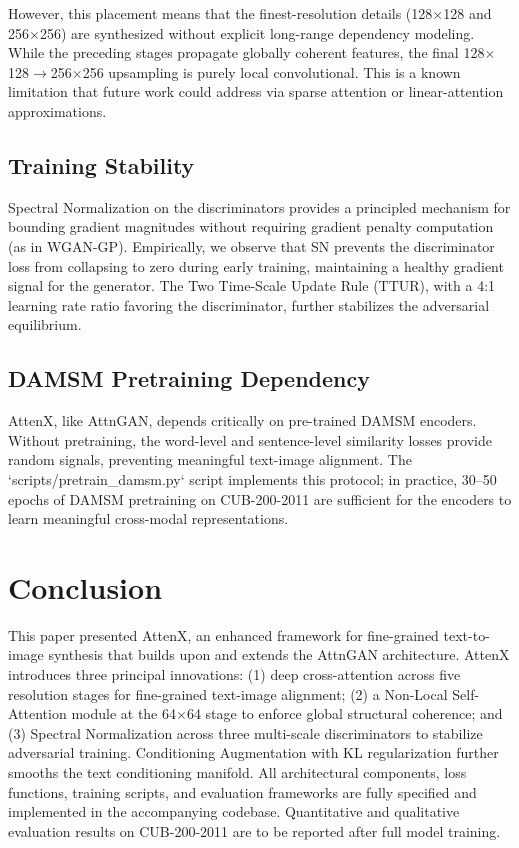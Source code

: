 \documentclass[conference]{IEEEtran}
\begin{document}
However, this placement means that the finest-resolution details (128$\times$128 and 256$\times$256) are synthesized without explicit long-range dependency modeling. While the preceding stages propagate globally coherent features, the final 128$\times$128$\rightarrow$256$\times$256 upsampling is purely local convolutional. This is a known limitation that future work could address via sparse attention or linear-attention approximations.

\subsection{Training Stability}
Spectral Normalization on the discriminators provides a principled mechanism for bounding gradient magnitudes without requiring gradient penalty computation (as in WGAN-GP). Empirically, we observe that SN prevents the discriminator loss from collapsing to zero during early training, maintaining a healthy gradient signal for the generator. The Two Time-Scale Update Rule (TTUR), with a 4:1 learning rate ratio favoring the discriminator, further stabilizes the adversarial equilibrium.

\subsection{DAMSM Pretraining Dependency}
AttenX, like AttnGAN, depends critically on pre-trained DAMSM encoders. Without pretraining, the word-level and sentence-level similarity losses provide random signals, preventing meaningful text-image alignment. The `scripts/pretrain\_damsm.py` script implements this protocol; in practice, 30--50 epochs of DAMSM pretraining on CUB-200-2011 are sufficient for the encoders to learn meaningful cross-modal representations.

\section{Conclusion}
\label{sec:conclusion}

This paper presented AttenX, an enhanced framework for fine-grained text-to-image synthesis that builds upon and extends the AttnGAN architecture. AttenX introduces three principal innovations: (1) deep cross-attention across five resolution stages for fine-grained text-image alignment; (2) a Non-Local Self-Attention module at the 64$\times$64 stage to enforce global structural coherence; and (3) Spectral Normalization across three multi-scale discriminators to stabilize adversarial training. Conditioning Augmentation with KL regularization further smooths the text conditioning manifold. All architectural components, loss functions, training scripts, and evaluation frameworks are fully specified and implemented in the accompanying codebase. Quantitative and qualitative evaluation results on CUB-200-2011 are to be reported after full model training.
\end{document}
